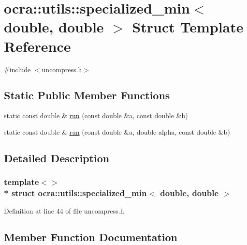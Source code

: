 \hypertarget{structocra_1_1utils_1_1specialized__min_3_01double_00_01double_01_4}{}\section{ocra\+:\+:utils\+:\+:specialized\+\_\+min$<$ double, double $>$ Struct Template Reference}
\label{structocra_1_1utils_1_1specialized__min_3_01double_00_01double_01_4}


{\ttfamily \#include $<$uncompress.\+h$>$}

\subsection*{Static Public Member Functions}
\begin{DoxyCompactItemize}
\item 
static const double \& \hyperlink{structocra_1_1utils_1_1specialized__min_3_01double_00_01double_01_4_a846635806abbd79b2039e4e67518c909}{run} (const double \&a, const double \&b)
\item 
static const double \& \hyperlink{structocra_1_1utils_1_1specialized__min_3_01double_00_01double_01_4_ab6fb30f9ef59133eb89e51c388c84409}{run} (const double \&a, double alpha, const double \&b)
\end{DoxyCompactItemize}


\subsection{Detailed Description}
\subsubsection*{template$<$$>$\\*
struct ocra\+::utils\+::specialized\+\_\+min$<$ double, double $>$}



Definition at line 44 of file uncompress.\+h.



\subsection{Member Function Documentation}
